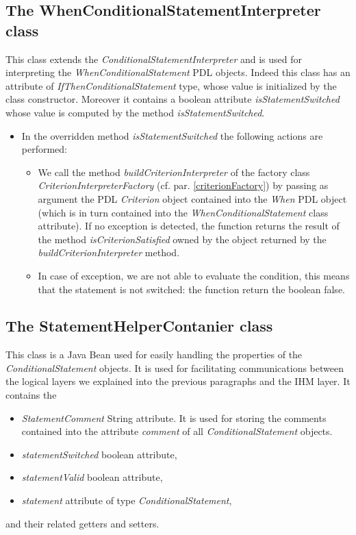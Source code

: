 \documentclass[a4paper,11pt] {ivoa}
\begin{document}
\subsection{The WhenConditionalStatementInterpreter class}
This class extends the {\it ConditionalStatementInterpreter} and is used for
interpreting the {\it WhenConditionalStatement} PDL objects. Indeed this class
has an attribute of {\it IfThenConditionalStatement} type, whose value is
initialized by the class constructor. Moreover it contains a boolean attribute
{\it isStatementSwitched} whose value is computed by the method {\it
isStatementSwitched}.\\
\begin{itemize}
\item In the overridden method {\it isStatementSwitched} the following actions are performed:
\begin{itemize}
\item We call the method {\it buildCriterionInterpreter} of the factory class
{\it CriterionInterpreterFactory} (cf. par. \ref{criterionFactory}) by passing
as argument the PDL {\it Criterion} object contained into the {\it When} PDL
object (which is in turn contained into the {\it WhenConditionalStatement} class attribute). If no
exception is detected, the function returns the result of the method {\it isCriterionSatisfied} owned by the object returned by the {\it buildCriterionInterpreter} method.
\item In case of exception, we are not able to evaluate the condition, this means that the statement is not switched: the function return the boolean false.\\
\end{itemize}
\end{itemize}


\subsection{The StatementHelperContanier class}\label{StatementHelperContainer}
This class is a Java Bean used for easily handling the properties of the {\it ConditionalStatement} objects. It is used for facilitating communications between the logical layers we explained into the previous paragraphs and the IHM layer. It contains the 
\begin{itemize}
\item {\it StatementComment} String attribute. It is used for storing the comments contained into the attribute {\it comment} of all {\it ConditionalStatement} objects.
\item {\it statementSwitched} boolean attribute,
\item {\it statementValid} boolean attribute,
\item {\it statement} attribute of type {\it ConditionalStatement},
\end{itemize}
and their related getters and setters.
\end{document}
